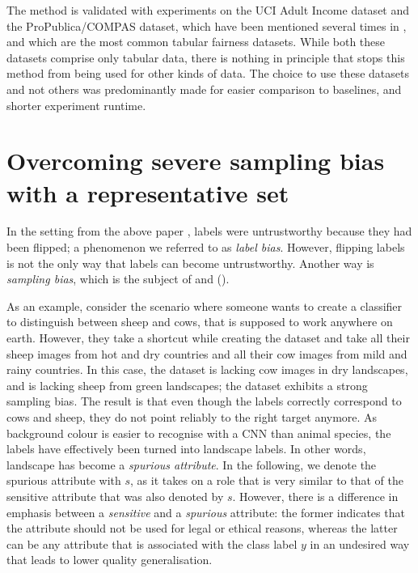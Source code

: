 The method is validated with experiments
on the UCI Adult Income dataset and the ProPublica/COMPAS dataset,
which have been mentioned several times in ,
and which are the most common tabular fairness datasets.
While both these datasets comprise only tabular data,
there is nothing in principle that stops this method from being used for other kinds of data.
The choice to use these datasets and not others
was predominantly made for easier comparison to baselines,
and shorter experiment runtime.

\section{Overcoming severe sampling bias with a representative set}\label{sec:nifr}
In the setting from the above paper \citep{kehrenberg2020tuning},
labels were untrustworthy because they had been flipped;
a phenomenon we referred to as \emph{label bias}.
However, flipping labels is not the only way that labels can become untrustworthy.
Another way is \emph{sampling bias}, which is the subject of \citet{kehrenberg2020nullsampling} and \citet{kehrenberg2020zeroshot} ().

As an example, consider the scenario where someone wants to create a classifier
to distinguish between sheep and cows, that is supposed to work anywhere on earth.
However, they take a shortcut while creating the dataset
and take all their sheep images from hot and dry countries
and all their cow images from mild and rainy countries.
In this case, the dataset is lacking cow images in dry landscapes,
and is lacking sheep from green landscapes;
the dataset exhibits a strong sampling bias.
The result is that even though the labels correctly correspond to cows and sheep,
they do not point reliably to the right target anymore.
As background colour is easier to recognise with a \ac{CNN} than animal species,
the labels have effectively been turned into landscape labels.
In other words, landscape has become a \emph{spurious attribute}.
%
In the following, we denote the spurious attribute with \(s\),
as it takes on a role that is very similar to that of the sensitive attribute that was also denoted by \(s\).
However, there is a difference in emphasis between a \emph{sensitive} and a \emph{spurious} attribute:
the former indicates that the attribute should not be used for legal or ethical reasons,
whereas the latter can be any attribute that is associated with the class label \(y\) in an undesired way
that leads to lower quality generalisation.


